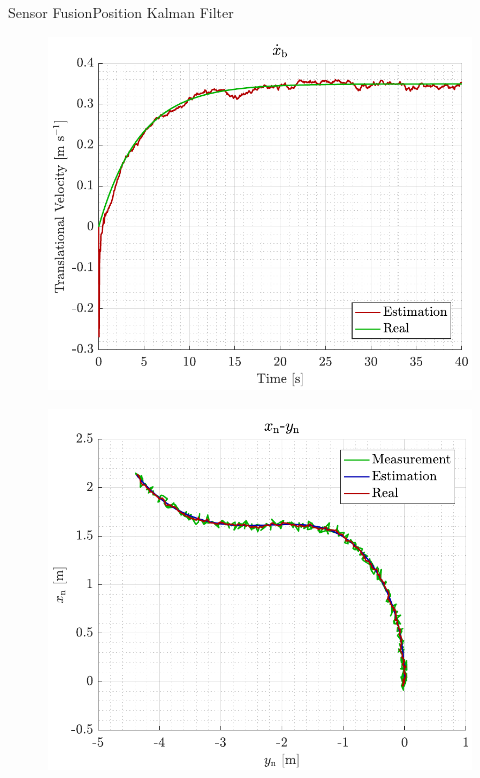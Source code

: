 \begin{frame}{Sensor Fusion}{Position Kalman Filter}
    \begin{minipage}{0.45\linewidth}
        \begin{figure}[H]
            \centering
            \includegraphics[width=1\linewidth]{figures/sim_xbdot}
        \end{figure}        
    \end{minipage}\hfill      
    \begin{minipage}{0.45\linewidth}
        \begin{figure}[H]
            \centering
            \includegraphics[width=1\linewidth]{figures/sim_xnyn}
        \end{figure}                
    \end{minipage}\hfill \\
\end{frame}






